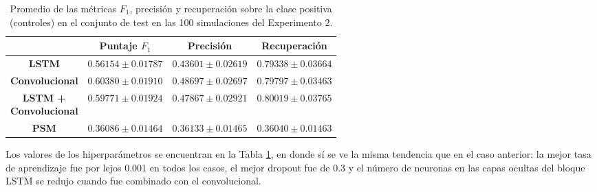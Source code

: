 \documentclass[../../main.tex]{subfiles}
\begin{document}
\begin{table}[H]
    \centering
    \renewcommand{\arraystretch}{1.2}
    \begin{tabular}{|c|c|c|c|}
        \hline
         & \textbf{Puntaje} \(F_1\) & \textbf{Precisión} & \textbf{Recuperación} \\ \hline\hline
        \textbf{LSTM}
            & $0.56154 \pm 0.01787$ & $0.43601 \pm 0.02619$ & $0.79338 \pm 0.03664$ \\ \hline
        \textbf{Convolucional}
            & $\mathbf{0.60380 \pm 0.01910}$ & $\mathbf{0.48697 \pm 0.02697}$ & $0.79797 \pm 0.03463$ \\ \hline
        \makecell{\textbf{LSTM +} \\ \textbf{Convolucional}}
            & $0.59771 \pm 0.01924$ & $0.47867 \pm 0.02921$ & $\mathbf{0.80019 \pm 0.03765}$ \\ \hline
        \textbf{PSM}
            & $0.36086 \pm 0.01464$ & $0.36133 \pm 0.01465$ & $0.36040 \pm 0.01463$ \\
        \hline
    \end{tabular}
    \caption{Promedio de las métricas \(F_1\), precisión y recuperación sobre la
    clase positiva (controles) en el conjunto de test en las 100 simulaciones del
    Experimento 2.}
    \label{tab:results_exp2}
\end{table}

Los valores de los hiperparámetros se encuentran en la Tabla \ref{tab:results_exp2}, en
donde sí se ve la misma tendencia que en el caso anterior: la mejor tasa de aprendizaje
fue por lejos 0.001 en todos los casos, el mejor dropout fue de 0.3 y el número de
neuronas en las capas ocultas del bloque LSTM se redujo cuando fue combinado con el
convolucional.
\end{document}
